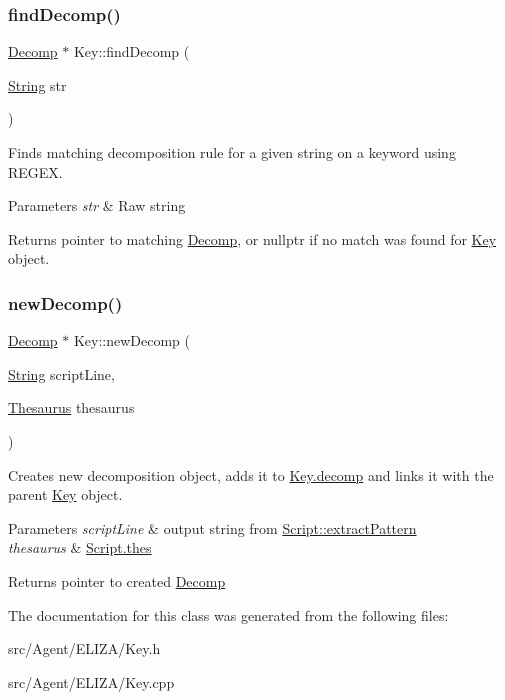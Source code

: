 \subsubsection{\texorpdfstring{find\+Decomp()}{findDecomp()}}
{\footnotesize\ttfamily \mbox{\hyperlink{classDecomp}{Decomp}} $\ast$ Key\+::find\+Decomp (\begin{DoxyParamCaption}\item[{\mbox{\hyperlink{classString}{String}}}]{str }\end{DoxyParamCaption})}

Finds matching decomposition rule for a given string on a keyword using R\+E\+G\+EX. 
\begin{DoxyParams}{Parameters}
{\em str} & Raw string \\
\hline
\end{DoxyParams}
\begin{DoxyReturn}{Returns}
pointer to matching \mbox{\hyperlink{classDecomp}{Decomp}}, or nullptr if no match was found for \mbox{\hyperlink{classKey}{Key}} object. 
\end{DoxyReturn}
\mbox{\label{classKey_aef5468eea2222639cf3bb839cdd6e6af}} 
\subsubsection{\texorpdfstring{new\+Decomp()}{newDecomp()}}
{\footnotesize\ttfamily \mbox{\hyperlink{classDecomp}{Decomp}} $\ast$ Key\+::new\+Decomp (\begin{DoxyParamCaption}\item[{\mbox{\hyperlink{classString}{String}}}]{script\+Line,  }\item[{\mbox{\hyperlink{classThesaurus}{Thesaurus}}}]{thesaurus }\end{DoxyParamCaption})}

Creates new decomposition object, adds it to \mbox{\hyperlink{classKey_a48cc30fe4323cd4a0109bdca4c19efd5}{Key.\+decomp}} and links it with the parent \mbox{\hyperlink{classKey}{Key}} object. 
\begin{DoxyParams}{Parameters}
{\em script\+Line} & output string from \mbox{\hyperlink{classScript_a946d037839b4caada09e22a428c8f42e}{Script\+::extract\+Pattern}} \\
\hline
{\em thesaurus} & \mbox{\hyperlink{classScript_afaaa5f986fb3638e31c51231408cfbeb}{Script.\+thes}} \\
\hline
\end{DoxyParams}
\begin{DoxyReturn}{Returns}
pointer to created \mbox{\hyperlink{classDecomp}{Decomp}} 
\end{DoxyReturn}


The documentation for this class was generated from the following files\+:\begin{DoxyCompactItemize}
\item 
src/\+Agent/\+E\+L\+I\+Z\+A/Key.\+h\item 
src/\+Agent/\+E\+L\+I\+Z\+A/Key.\+cpp\end{DoxyCompactItemize}
